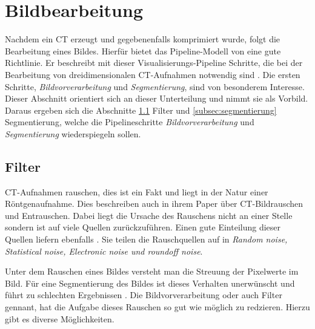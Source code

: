 \section{Bildbearbeitung}
\label{sec:bildbearbeitung} Nachdem ein CT erzeugt und gegebenenfalls
komprimiert wurde, folgt die Bearbeitung eines Bildes. Hierfür bietet das
Pipeline-Modell von \citet[Seite 50]{handels2000} eine gute Richtlinie. Er beschreibt
mit dieser Visualisierungs-Pipeline Schritte, die bei der Bearbeitung von
dreidimensionalen CT-Aufnahmen notwendig sind \citep[vgl.][Seite 50]{handels2000}.
Die ersten Schritte, \textit{Bildvorverarbeitung} und \textit{Segmentierung}, sind
von besonderem Interesse. Dieser Abschnitt orientiert sich an dieser
Unterteilung und nimmt sie als Vorbild. Daraus ergeben sich die Abschnitte \ref{subsec:filter}
Filter und \ref{subsec:segmentierung} Segmentierung, welche die Pipelineschritte
\textit{Bildvorverarbeitung} und \textit{Segmentierung} wiederspiegeln sollen.

\subsection{Filter}
\label{subsec:filter} CT-Aufnahmen rauschen, dies ist ein Fakt und liegt in der Natur
einer Röntgenaufnahme. Dies beschreiben auch \citet[Kapitel 3]{diwakar2018} in
ihrem Paper über CT-Bildrauschen und Entrauschen. Dabei liegt die Ursache des Rauschens
nicht an einer Stelle sondern ist auf viele Quellen zurückzuführen. Einen gute
Einteilung dieser Quellen liefern ebenfalls \citet[Kapitel 3]{diwakar2018}. Sie teilen
die Rauschquellen auf in \textit{Random noise, Statistical noise, Electronic
noise und roundoff noise}.

Unter dem Rauschen eines Bildes versteht man die Streuung der Pixelwerte im Bild.
Für eine Segmentierung des Bildes ist dieses Verhalten unerwünscht und führt zu schlechten
Ergebnissen \citep[vgl.][Seite 51]{handels2000}. Die Bildvorverarbeitung oder
auch Filter gennant, hat die Aufgabe dieses Rauschen so gut wie möglich zu redzieren.
Hierzu gibt es diverse Möglichkeiten.

